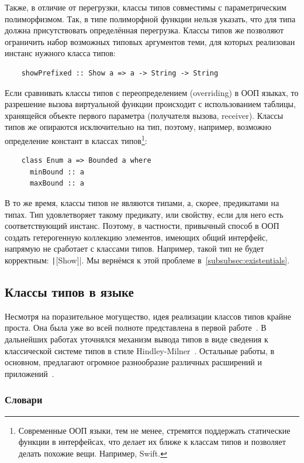 Также, в отличие от перегрузки, классы типов совместимы с параметрическим полиморфизмом.
Так, в типе полиморфной функции нельзя указать, что для типа должна присутствовать определённая перегрузка.
Классы типов же позволяют ограничить набор возможных типовых аргументов теми, для которых реализован инстанс нужного класса типов:
\begin{verbatim}
    showPrefixed :: Show a => a -> String -> String
\end{verbatim}

Если сравнивать классы типов с переопределением (overriding) в ООП языках, то разрешение вызова виртуальной функции происходит с использованием таблицы, хранящейся объекте первого параметра (получателя вызова, receiver).
Классы типов же опираются исключительно на тип, поэтому, например, возможно определение констант в классах типов\footnote{Современные ООП языки, тем не менее, стремятся поддержать статические функции в интерфейсах, что делает их ближе к классам типов и позволяет делать похожие вещи. Например, Swift.}: %
\begin{verbatim}
    class Enum a => Bounded a where
      minBound :: a
      maxBound :: a
\end{verbatim}

В то же время, классы типов не являются типами, а, скорее, предикатами на типах.
Тип удовлетворяет такому предикату, или свойству, если для него есть соответствующий инстанс.
Поэтому, в частности, привычный способ в ООП создать гетерогенную коллекцию элементов, имеющих общий интерфейс, напрямую не сработает с классами типов.
Например, такой тип не будет корректным: \texttt|[Show]|.
Мы вернёмся к этой проблеме в~\ref{subsubsec:existentials}.

\subsection{Классы типов в языке}

Несмотря на поразительное могущество, идея реализации классов типов крайне проста.
Она была уже во всей полноте представлена в первой работе~\cite{wadler1989make}.
В дальнейших работах уточнялся механизм вывода типов в виде сведения к классической системе типов в стиле Hindley-Milner~\cite{hall1996type}.
Остальные работы, в основном, предлагают огромное разнообразие различных расширений и приложений~\cite{jones1997type}.

\subsubsection{Словари} \label{subsubsec:tc-dict}

